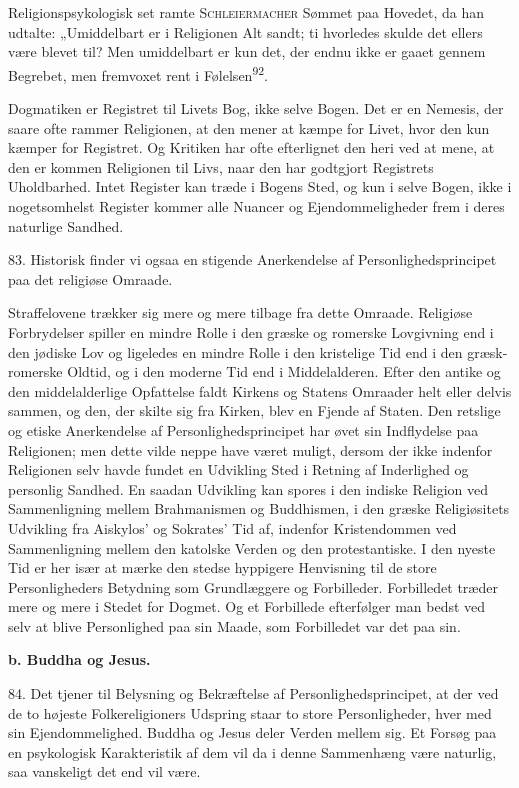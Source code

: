 \documentclass[12pt,a4paper,openany]{book}
\newcommand{\opage}[1]{\marginnote{\footnotesize\textit{[#1]}}}
\begin{document}
Religionspsykologisk set ramte \textsc{Schleiermacher} Sømmet paa
Hovedet, da han udtalte: „Umiddelbart er i Religionen Alt sandt;
\opage{193}ti hvorledes skulde det ellers være blevet til? Men
umiddelbart er kun det, der endnu ikke er gaaet gennem Begrebet, men
fremvoxet rent i Følelsen\textsuperscript{92}.

Dogmatiken er Registret til Livets Bog, ikke selve Bogen. Det er en
Nemesis, der saare ofte rammer Religionen, at den mener at kæmpe for
Livet, hvor den kun kæmper for Registret. Og Kritiken har ofte
efterlignet den heri ved at mene, at den er kommen Religionen til Livs,
naar den har godtgjort Registrets Uholdbarhed. Intet Register kan træde
i Bogens Sted, og kun i selve Bogen, ikke i nogetsomhelst Register
kommer alle Nuancer og Ejendommeligheder frem i deres naturlige Sandhed.

83. Historisk finder vi ogsaa en stigende Anerkendelse af
Personlighedsprincipet paa det religiøse Omraade.

Straffelovene trækker sig mere og mere tilbage fra dette Omraade.
Religiøse Forbrydelser spiller en mindre Rolle i den græske og romerske
Lovgivning end i den jødiske Lov og ligeledes en mindre Rolle i den
kristelige Tid end i den græsk-romerske Oldtid, og i den moderne Tid end
i Middelalderen. Efter den antike og den middelalderlige Opfattelse
faldt Kirkens og Statens Omraader helt eller delvis sammen, og den, der
skilte sig fra Kirken, blev en Fjende af Staten. Den retslige og etiske
Anerkendelse af Personlighedsprincipet har øvet sin Indflydelse paa
Religionen; men dette vilde neppe have været muligt, dersom der ikke
indenfor Religionen selv havde fundet en Udvikling Sted i Retning af
Inderlighed og personlig Sandhed. En saadan Udvikling kan spores i den
indiske Religion ved Sammenligning mellem Brahmanismen og Buddhismen, i
den græske Religiøsitets Udvikling fra Aiskylos’ og Sokrates’ Tid af,
indenfor Kristendommen ved Sammenligning mellem den katolske Verden og
den protestantiske. I den nyeste Tid er her især at mærke den stedse
hyppigere Henvisning til de store Personligheders Betydning som
Grundlæggere og Forbilleder. Forbilledet træder mere og mere i Stedet
for Dogmet. Og et Forbillede efterfølger man bedst ved selv at blive
Personlighed paa sin Maade, som Forbilledet var det paa sin.

\begin{center}\textbf{b. Buddha og Jesus.}\end{center}

84. Det tjener til Belysning og Bekræftelse af Personlighedsprincipet,
at der ved de to højeste Folkereligioners Udspring staar to store
Personligheder, hver med sin Ejendommelighed. Buddha og Jesus deler
Verden mellem sig. Et Forsøg paa en psykologisk
\opage{194}Karakteristik af dem vil da i denne Sammenhæng være naturlig,
saa vanskeligt det end vil være.
\end{document}
